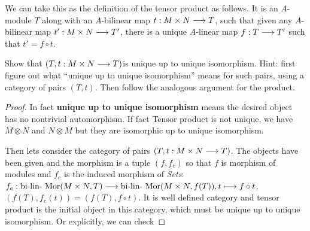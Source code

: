 \documentclass[11pt]{book} %
\begin{document}
\begin{exr}
We can take this as the definition of the tensor product as follows. It is an $A$-module $T$ along with an $A$-bilinear map $t: M \times N \longrightarrow T$, such that given any $A$-bilinear map $t':M\times N\longrightarrow T'$, there is a unique $A$-linear map $f:T \longrightarrow T'$ such that $t' =f\circ t$.

\begin{center}
\end{center}
  
Show that $(T,t:M\times N\longrightarrow T)$is unique up to unique isomorphism. Hint: first figure out what “unique up to unique isomorphism” means for such pairs, using a category of pairs $(T, t)$. Then follow the analogous argument for the product.
\end{exr}
\begin{proof}
In fact \textbf{unique up to unique isomorphism} means the desired object has no nontrivial automorphism. If fact Tensor product is not unique, we have $M\otimes N$ and $N\otimes M$ but they are isomorphic up to unique isomorphism.

Then lets consider the category of pairs $(T,t: M\times N\longrightarrow T)$. The objects have been given and the morphism is a tuple $(f, f_{e})$ so that $f$ is  morphism of modules and $f_{e}$ is the induced morphism of \textit{Sets}: $f_e:\text{bi-lin-}\text{ Mor}(M\times N, T)\longrightarrow \text{bi-lin-}\text{ Mor}(M\times N, f(T)), t\longmapsto f\circ t$. $(f(T), f_{e}(t))=(f(T), f\circ t)$. It is well defined category and tensor product is the initial object in this category, which must be unique up to unique isomorphism. Or explicitly, we can check
\end{proof}
\end{document}
